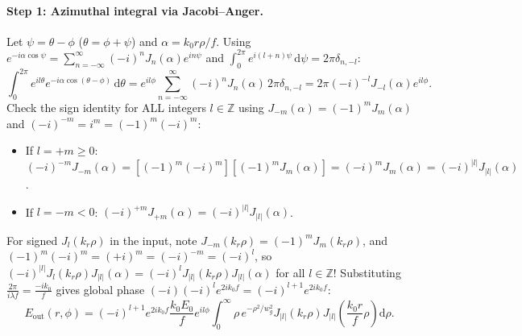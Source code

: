 \documentclass[10pt,letterpaper]{article}
\newcommand{\abs}[1]{\lvert #1 \rvert}
\newcommand{\dd}{\mathrm{d}}
\numberwithin{equation}{section}
\begin{document}
\paragraph*{Step 1: Azimuthal integral via Jacobi--Anger.}
Let $\psi = \theta - \phi$ ($\theta = \phi + \psi$) and $\alpha = k_0 r\rho/f$. Using $e^{-i\alpha\cos\psi} = \sum_{n=-\infty}^\infty (-i)^n J_n(\alpha) e^{in\psi}$ and $\int_0^{2\pi} e^{i(l+n)\psi}\,\dd\psi = 2\pi\delta_{n,-l}$:
\begin{equation}
  \int_0^{2\pi} e^{il\theta} e^{-i\alpha\cos(\theta-\phi)}\,\dd\theta = e^{il\phi}\sum_{n=-\infty}^\infty (-i)^n J_n(\alpha)\,2\pi\delta_{n,-l} = 2\pi (-i)^{-l} J_{-l}(\alpha) e^{il\phi}.
\end{equation}
Check the sign identity for ALL integers $l \in \mathbb{Z}$ using $J_{-m}(\alpha) = (-1)^m J_m(\alpha)$ and $(-i)^{-m} = i^m = (-1)^m(-i)^m$:
\begin{itemize}[leftmargin=1.5em,itemsep=1pt,topsep=2pt]
  \item If $l = +m \ge 0$: $(-i)^{-m} J_{-m}(\alpha) = [(-1)^m(-i)^m][(-1)^m J_m(\alpha)] = (-i)^m J_m(\alpha) = (-i)^{\abs{l}} J_{\abs{l}}(\alpha)$.
  \item If $l = -m < 0$: $(-i)^{+m} J_{+m}(\alpha) = (-i)^{\abs{l}} J_{\abs{l}}(\alpha)$.
\end{itemize}
For signed $J_l(k_r\rho)$ in the input, note $J_{-m}(k_r\rho) = (-1)^m J_m(k_r\rho)$, and $(-1)^m (-i)^m = (+i)^m = (-i)^{-m} = (-i)^l$, so $(-i)^{\abs{l}} J_l(k_r\rho) J_{\abs{l}}(\alpha) = (-i)^l J_{\abs{l}}(k_r\rho) J_{\abs{l}}(\alpha)$ for all $l \in \mathbb{Z}$!
Substituting $\frac{2\pi}{i\lambda f} = \frac{-i k_0}{f}$ gives global phase $(-i)(-i)^l e^{2ik_0 f} = (-i)^{l+1} e^{2ik_0 f}$:
\begin{equation}
  E_{\mathrm{out}}(r,\phi) = (-i)^{l+1} e^{2ik_0 f} \frac{k_0 E_0}{f} e^{il\phi} \int_0^\infty \rho\,e^{-\rho^2/w_g^2} J_{\abs{l}}(k_r\rho) J_{\abs{l}}\!\left(\frac{k_0 r}{f}\rho\right)\dd\rho.
\end{equation}
\end{document}

